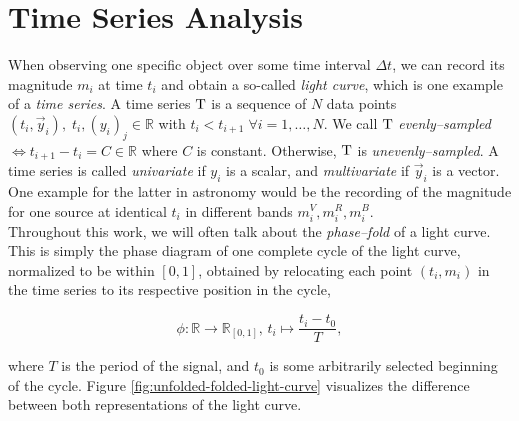 \section{Time Series Analysis}
\label{sec:statistical-analysis-time-series}

When observing one specific object over some time interval $\Delta t$, we can record its magnitude $m_i$ at time $t_i$ and obtain a so-called \emph{light curve}, which is one example of a \emph{time series}. A time series $\mathrm{T}$ is a sequence of $N$ data points $(t_i, \vec y_i),\; t_i,(y_i)_j \in \mathbb{R}$ with $t_i < t_{i+1} \; \forall i = 1,\ldots,N$. We call $\mathrm{T}$ \emph{evenly--sampled} $\Leftrightarrow t_{i+1} - t_i = C \in \mathbb{R}$ where $C$ is constant. Otherwise, $\mathrm{T}$ is \emph{unevenly--sampled}. A time series is called \emph{univariate} if $y_i$ is a scalar, and \emph{multivariate} if $\vec y_i$ is a vector. One example for the latter in astronomy would be the recording of the magnitude for one source at identical $t_i$ in different bands $m_i^{V}, m_i^{R}, m_i^{B}$.\\

Throughout this work, we will often talk about the \emph{phase--fold} of a light curve. This is simply the phase diagram of one complete cycle of the light curve, normalized to be within $[0,1]$, obtained by relocating each point $(t_i, m_i)$ in the time series to its respective position in the cycle,

\begin{equation}
\label{eq:phase-fold}
\phi \colon \mathbb{R} \to \mathbb{R}_{[0, 1]},\, t_i \mapsto \frac{t_i - t_0}{T},
\end{equation}

where $T$ is the period of the signal, and $t_0$ is some arbitrarily selected beginning of the cycle. Figure \ref{fig:unfolded-folded-light-curve} visualizes the difference between both representations of the light curve.\\

